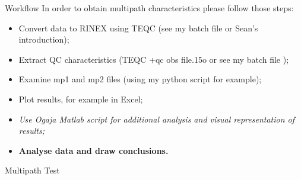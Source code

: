 \documentclass[11pt]{beamer}
\begin{document}
	\begin{frame}{Workflow}
		In order to obtain multipath characteristics please follow those steps:
		
		\begin{itemize}
			\item Convert data to RINEX using TEQC (see my batch file or Sean's introduction);
			\item {Extract QC characteristics  (TEQC +qc obs file.15o or see my batch file )};
			\item Examine mp1 and mp2 files (using my python script for example);
			\item Plot results, for example in Excel;
			\item \textit{Use Ogaja Matlab script for additional analysis and visual representation of results;}
			\item \textbf{Analyse data and draw conclusions.}
		\end{itemize}

	\end{frame}

{ 

\begin{frame}{Multipath Test}
	\begin{table}
		\centering
		\begin{minipage}[t]{\textwidth}%
			\caption{OSGB coordinates for the Project 1}
		\end{minipage}
	\end{table}
	
\end{frame}
} %
\end{document}

